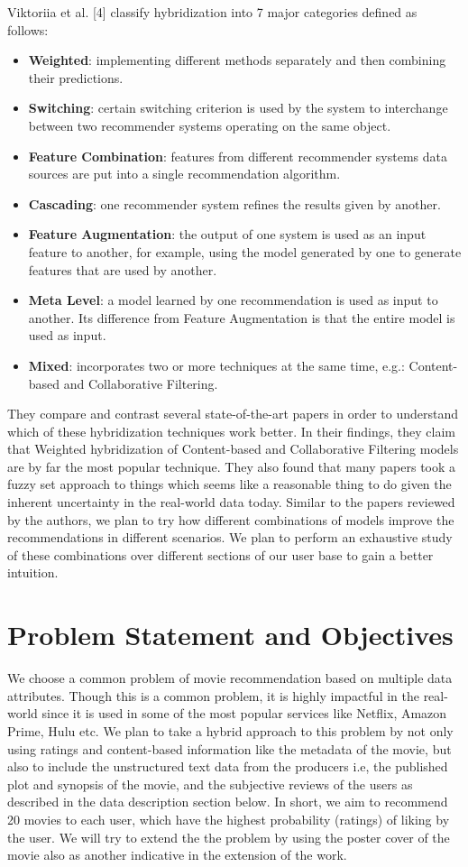 \documentclass{article}
\begin{document}
Viktoriia et al. [4] classify hybridization into 7 major categories defined as follows:
\begin{itemize}
    \item \textbf{Weighted}: implementing different methods separately and then combining their predictions.
    \item \textbf{Switching}: certain switching criterion is used by the system to interchange between two recommender systems operating on the same object.
    \item \textbf{Feature Combination}: features from different recommender systems data sources are put into a single recommendation algorithm. 
    \item \textbf{Cascading}: one recommender system refines the results given by another. 
    \item \textbf{Feature Augmentation}: the output of one system is used as an input feature to another, for example, using the model generated by one to generate features that are used by another. 
    \item \textbf{Meta Level}: a model learned by one recommendation is used as input to another. Its difference from Feature Augmentation is that the entire model is used as input. 
    \item \textbf{Mixed}: incorporates two or more techniques at the same time, e.g.: Content-based and Collaborative Filtering. 
\end{itemize}
They compare and contrast several state-of-the-art papers in order to understand which of these hybridization techniques work better. In their findings, they claim that Weighted hybridization of Content-based and Collaborative Filtering models are by far the most popular technique. They also found that many papers took a fuzzy set approach to things which seems like a reasonable thing to do given the inherent uncertainty in the real-world data today. Similar to the papers reviewed by the authors, we plan to try how different combinations of models improve the recommendations in different scenarios. We plan to perform an exhaustive study of these combinations over different sections of our user base to gain a better intuition.


\section{Problem Statement and Objectives}
We choose a common problem of movie recommendation based on multiple data attributes. Though this is a common problem, it is highly impactful in the real-world since it is used in some of the most popular services like Netflix, Amazon Prime, Hulu etc. We plan to take a hybrid approach to this problem by not only using ratings and content-based information like the metadata of the movie, but also to include the unstructured text data from the producers i.e, the published plot and synopsis of the movie, and the subjective reviews of the users as described in the data description section below. In short, we aim to recommend 20 movies to each user, which have the highest probability (ratings) of liking by the user. We will try to extend the the problem by using the poster cover of the movie also as another indicative in the extension of the work.
\end{document}
